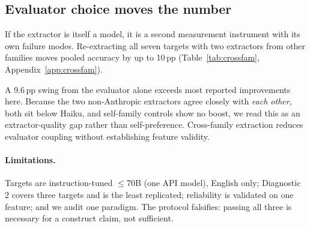 \subsection{Evaluator choice moves the number}
\label{sec:evaluator}

If the extractor is itself a model, it is a second measurement instrument with its own failure modes. Re-extracting all seven targets with two extractors from other families moves pooled accuracy by up to 10\,pp (Table~\ref{tab:crossfam}, Appendix~\ref{app:crossfam}).


A 9.6\,pp swing from the evaluator alone exceeds most reported improvements here. Because the two non-Anthropic extractors agree closely with \emph{each other}, both sit below Haiku, and self-family controls show no boost, we read this as an extractor-quality gap rather than self-preference. Cross-family extraction reduces evaluator coupling without establishing feature validity.

\paragraph{Limitations.} Targets are instruction-tuned $\leq$70B (one API model), English only; Diagnostic 2 covers three targets and is the least replicated; reliability is validated on one feature; and we audit one paradigm. The protocol falsifies: passing all three is necessary for a construct claim, not sufficient.

